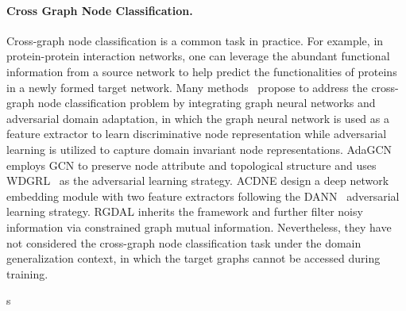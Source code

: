 \paragraph{Cross Graph Node Classification.}
Cross-graph node classification is a common task in practice. For example, in protein-protein interaction networks, one can leverage the abundant functional information from a source network to help predict the functionalities of proteins in a newly formed target network.
Many methods~\cite{dai2022graph,shen2020adversarial,yang2022robust} propose to address the cross-graph node classification problem by integrating graph neural networks and adversarial domain adaptation, in which the graph neural network is used as a feature extractor to learn discriminative node representation while adversarial learning is utilized to capture domain invariant node representations. AdaGCN\cite{dai2022graph} employs GCN\cite{kipf2017semi} to preserve node attribute and topological structure and uses WDGRL~\cite{shen2018wasserstein} as the adversarial learning strategy. ACDNE\cite{shen2020adversarial} design a deep network embedding module with two feature extractors following the DANN~\cite{ganin2016domain} adversarial learning strategy. RGDAL\cite{yang2022robust} inherits the framework and further filter noisy information via constrained graph mutual information. Nevertheless, they have not considered the cross-graph node classification task under the domain generalization context, in which the target graphs cannot be accessed during training.


s